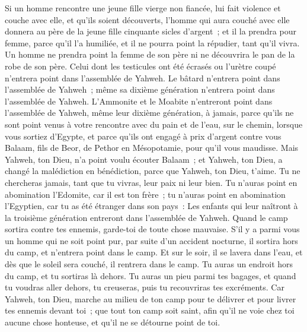 \begin{multicols}{2}
Si un homme rencontre une jeune fille vierge non fiancée, lui fait violence et couche avec elle, et qu'ils soient découverts,
l'homme qui aura couché avec elle donnera au père de la jeune fille cinquante sicles d'argent~; et il la prendra pour femme, parce qu'il l'a humiliée, et il ne pourra point la répudier, tant qu'il vivra.
Un homme ne prendra point la femme de son père ni ne découvrira le pan de la robe de son père.
\VerseOne{}Celui dont les testicules ont été écrasés ou l'urètre coupé n'entrera point dans l'assemblée de Yahweh.
Le bâtard n'entrera point dans l'assemblée de Yahweh~; même sa dixième génération n'entrera point dans l'assemblée de Yahweh.
L'Ammonite et le Moabite n'entreront point dans l'assemblée de Yahweh, même leur dixième génération, à jamais,
parce qu'ils ne sont point venus à votre rencontre avec du pain et de l'eau, sur le chemin, lorsque vous sortiez d'Egypte, et parce qu'ils ont engagé à prix d'argent contre vous Balaam, fils de Beor, de Pethor en Mésopotamie, pour qu'il vous maudisse.
Mais Yahweh, ton Dieu, n'a point voulu écouter Balaam~; et Yahweh, ton Dieu, a changé la malédiction en bénédiction, parce que Yahweh, ton Dieu, t'aime.
Tu ne chercheras jamais, tant que tu vivras, leur paix ni leur bien.
Tu n'auras point en abomination l'Edomite, car il est ton frère~; tu n'auras point en abomination l'Egyptien, car tu as été étranger dans son pays~:
Les enfants qui leur naîtront à la troisième génération entreront dans l'assemblée de Yahweh.
Quand le camp sortira contre tes ennemis, garde-toi de toute chose mauvaise.
S'il y a parmi vous un homme qui ne soit point pur, par suite d'un accident nocturne, il sortira hors du camp, et n'entrera point dans le camp.
Et sur le soir, il se lavera dans l'eau, et dès que le soleil sera couché, il rentrera dans le camp.
Tu auras un endroit hors du camp, et tu sortiras là dehors.
Tu auras un pieu parmi tes bagages, et quand tu voudras aller dehors, tu creuseras, puis tu recouvriras tes excréments.
Car Yahweh, ton Dieu, marche au milieu de ton camp pour te délivrer et pour livrer tes ennemis devant toi~; que tout ton camp soit saint, afin qu'il ne voie chez toi aucune chose honteuse, et qu'il ne se détourne point de toi.

\end{multicols}
